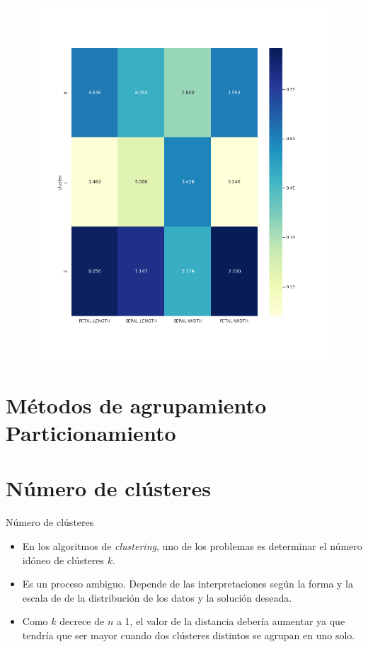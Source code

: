 \documentclass[spanish]{beamer}
\begin{document}
\begin{frame}
\begin{figure}[h]
\centering
\includegraphics[scale=0.29]{dani/heatmapMeanShiftIRIS.png}
\end{figure}
\end{frame}

\section{Métodos de agrupamiento\\ Particionamiento}



\section{Número de clústeres}
\begin{frame}{Número de clústeres}
	\begin{itemize}
		\item En los algoritmos de \textit{clustering}, uno de los problemas es determinar el número idóneo de clústeres $ k $. 
		\item Es un proceso ambiguo. Depende de las interpretaciones según la forma y la escala de de la distribución de los datos y la solución deseada.
		\item Como $ k $ decrece de $ n $ a 1, el valor de la distancia debería aumentar ya que tendría que ser mayor cuando dos clústeres distintos se agrupan en uno solo.
	\end{itemize}
\end{frame}
\end{document}
